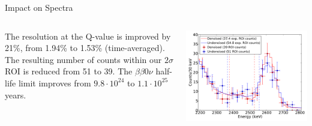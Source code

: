 \documentclass[final]{beamer} %
\begin{document}
\begin{frame}{}
\begin{columns}[t]
\begin{column}{.3\linewidth}
\begin{block}{Impact on Spectra}
      \begin{columns}
        \begin{column}{0.37\textwidth}
          The resolution at the Q-value is improved by 21\%, from 1.94\% to 1.53\% (time-averaged).  The resulting number of counts within our $2\sigma$ ROI is reduced from 51 to 39.  The $\beta\beta 0\nu$ half-life limit improves from $9.8 \cdot 10^{24}$ to $1.1 \cdot 10^{25}$ years.
        \end{column}
        \begin{column}{0.63\textwidth}
          \includegraphics[keepaspectratio=true,width=\textwidth]{DenoisedVsUndenoised_TotalPdfsWithData.pdf}
        \end{column}
      \end{columns}
    \end{block}



  \end{column}


  \end{columns}
  \end{frame}
  
\end{document}
